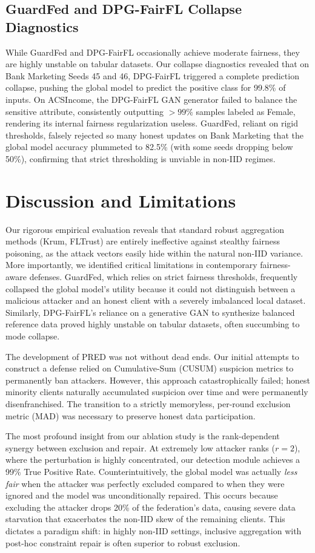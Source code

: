 \documentclass[journal]{IEEEtran}
\begin{document}
\subsection{GuardFed and DPG-FairFL Collapse Diagnostics}
While GuardFed and DPG-FairFL occasionally achieve moderate fairness, they are highly unstable on tabular datasets. Our collapse diagnostics revealed that on Bank Marketing Seeds 45 and 46, DPG-FairFL triggered a complete prediction collapse, pushing the global model to predict the positive class for 99.8\% of inputs. On ACSIncome, the DPG-FairFL GAN generator failed to balance the sensitive attribute, consistently outputting $>99\%$ samples labeled as Female, rendering its internal fairness regularization useless. GuardFed, reliant on rigid thresholds, falsely rejected so many honest updates on Bank Marketing that the global model accuracy plummeted to 82.5\% (with some seeds dropping below 50\%), confirming that strict thresholding is unviable in non-IID regimes.

\section{Discussion and Limitations}
Our rigorous empirical evaluation reveals that standard robust aggregation methods (Krum, FLTrust) are entirely ineffective against stealthy fairness poisoning, as the attack vectors easily hide within the natural non-IID variance. More importantly, we identified critical limitations in contemporary fairness-aware defenses. GuardFed, which relies on strict fairness thresholds, frequently collapsed the global model's utility because it could not distinguish between a malicious attacker and an honest client with a severely imbalanced local dataset. Similarly, DPG-FairFL's reliance on a generative GAN to synthesize balanced reference data proved highly unstable on tabular datasets, often succumbing to mode collapse.

The development of PRED was not without dead ends. Our initial attempts to construct a defense relied on Cumulative-Sum (CUSUM) suspicion metrics to permanently ban attackers. However, this approach catastrophically failed; honest minority clients naturally accumulated suspicion over time and were permanently disenfranchised. The transition to a strictly memoryless, per-round exclusion metric (MAD) was necessary to preserve honest data participation.

The most profound insight from our ablation study is the rank-dependent synergy between exclusion and repair. At extremely low attacker ranks ($r=2$), where the perturbation is highly concentrated, our detection module achieves a 99\% True Positive Rate. Counterintuitively, the global model was actually \textit{less fair} when the attacker was perfectly excluded compared to when they were ignored and the model was unconditionally repaired. This occurs because excluding the attacker drops 20\% of the federation's data, causing severe data starvation that exacerbates the non-IID skew of the remaining clients. This dictates a paradigm shift: in highly non-IID settings, inclusive aggregation with post-hoc constraint repair is often superior to robust exclusion.
\end{document}
